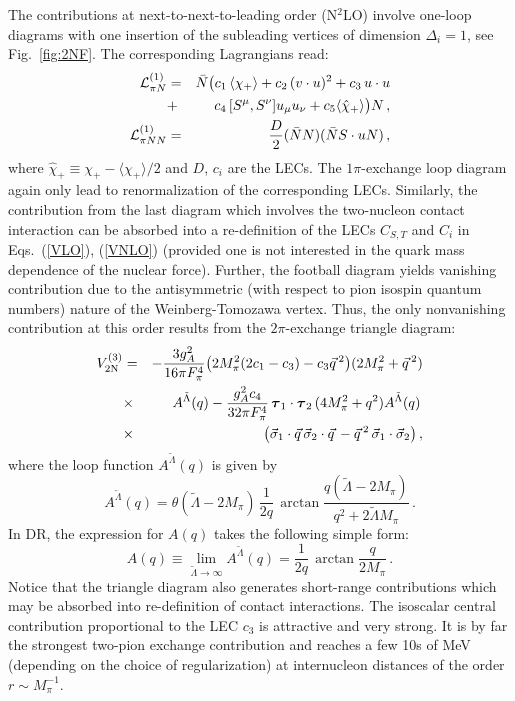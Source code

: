 \documentclass[aps,rmp,nofootinbib,twocolumn,floatfix]{revtex4}
\newcommand{\beq}{\begin{equation}}
\newcommand{\eeq}{\end{equation}}
\newcommand{\beqa}{\begin{eqnarray}}
\newcommand{\eeqa}{\end{eqnarray}}
\newcommand{\fet}[1]{\mbox{\boldmath $#1$}}
\newcommand{\nn}{\nonumber \\ }
\begin{document}
The contributions at next-to-next-to-leading order (N$^2$LO) involve one-loop
diagrams with one insertion of the subleading vertices of
dimension $\Delta_i = 1$, see Fig.~\ref{fig:2NF}. The corresponding Lagrangians read:
\beqa
\label{lagr1}
{\cal L}^{(1)}_{\pi N} & = & \bar{N} \big(  c_1 \, \langle \chi_+ \rangle + c_2 \, (v \cdot
       u)^2 + c_3 \, u \cdot u \nn
&+& c_4 \, [ S^\mu, S^\nu ] u_\mu u_\nu    + c_5 \langle \hat \chi_+ \rangle \big)
  N \,, \nn
{\cal L}^{(1)}_{\pi NN} & = & \frac{D}{2} (\bar{N} N) (\bar{N} S \cdot u N)\,,
\eeqa
where $\hat \chi_+ \equiv \chi_+ - \langle \chi_+ \rangle /2$ and $D$, $c_i$ are
the LECs. The $1\pi$-exchange loop diagram again only lead to renormalization
of the corresponding LECs. Similarly, the contribution from the last diagram
which involves the two-nucleon contact interaction can be absorbed into
a re-definition of the LECs $C_{S,T}$ and $C_i$ in Eqs.~(\ref{VLO}), (\ref{VNLO})
(provided one is not interested in the quark mass dependence of the nuclear
force). Further, the football diagram yields vanishing
contribution due to the antisymmetric (with respect to pion isospin quantum numbers)
nature of the Weinberg-Tomozawa vertex.   
Thus, the only nonvanishing contribution at this order results from the
$2\pi$-exchange triangle diagram:
\beqa
\label{VNNLO}
V^{(3)}_{\rm 2N} &=&  -\frac{3g_A^2}{16\pi F_\pi^4}  \big( 2M_\pi^2(2c_1 -c_3)
-c_3 \vec{q} \, ^2 \big) 
 (2M_\pi^2+\vec{q} \, ^2) \nn 
& \times & A^{\tilde \Lambda} (q)   - \frac{g_A^2 c_4 }{32\pi F_\pi^4} \, \fet{ \tau}_1 \cdot \fet{
  \tau}_2 \,  (4M_\pi^2 + q^2) A^{\tilde \Lambda}(q)\, \nn
& \times &
\big( \vec \sigma_1 \cdot \vec q\, \vec \sigma_2 \cdot \vec q\, 
-\vec{q} \, ^2 \, \vec \sigma_1 \cdot\vec \sigma_2 \big)\,,
\eeqa
where the loop function $A^{\tilde \Lambda} (q)$ is given by
\beq
A^{\tilde \Lambda} (q) = \theta (\tilde \Lambda - 2 M_\pi ) \, \frac{1}{2 q} \, 
\arctan \frac{q ( \tilde \Lambda - 2 M_\pi )}{q^2 + 2 \tilde \Lambda M_\pi}\,.
\eeq
In DR, the expression for $A(q)$ takes the following simple form:
\beq
A (q)  \equiv \lim_{\tilde \Lambda \to \infty} A^{\tilde \Lambda} (q) =
\frac{1}{2q}\, \arctan \frac{q}{2 M_\pi}\,.
\eeq
Notice that the triangle diagram also generates short-range contributions
which may be absorbed into re-definition of contact interactions. The
isoscalar central contribution proportional to the LEC $c_3$ is attractive and
very strong. It is by far the strongest two-pion exchange contribution and
reaches a few 10s of MeV (depending on the choice of
regularization) at internucleon distances of the order $r \sim M_\pi^{-1}$. 
\end{document}
